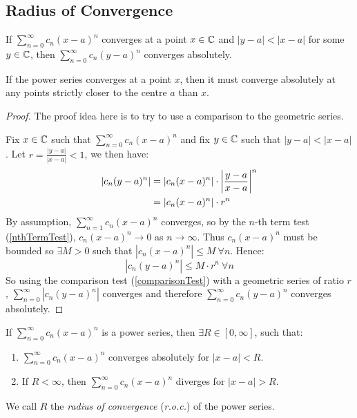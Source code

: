 \documentclass[../main.tex]{subfiles}
\begin{document}
\subsection{Radius of Convergence}
\begin{lemma}
  If $\sum_{n=0}^{\infty} c_n (x - a)^{n}$ converges at a point $x \in \mathbb{C}$ and $|y - a| < |x - a|$ for some $y \in \mathbb{C}$, then $\sum_{n = 0}^{\infty} c_n(y - a)^{n}$ converges absolutely. \label{powerSeriesConvLemma}
\end{lemma}
\begin{remark}
  If the power series converges at a point $x$, then it must converge absolutely at any points strictly closer to the centre $a$ than $x$.
\end{remark}
\begin{proof}
  The proof idea here is to try to use a comparison to the geometric series.

  Fix $x \in \mathbb{C}$ such that $\sum_{n = 0}^{\infty} c_n(x - a)^{n}$ and fix $y \in \mathbb{C}$ such that $|y - a| < |x - a|$.
  Let $r = \frac{|y - a|}{|x - a|} < 1$, we then have:
  \begin{align*}
    |c_n(y - a)^{n}| &= |c_n(x - a)^{n}| \cdot \left\lvert \frac{y - a}{x - a} \right\rvert^{n} \\
                     &= |c_n(x - a)^{n}| \cdot r^{n}
  \end{align*}
  By assumption, $\sum_{n = 1}^{\infty} c_n(x - a)^{n}$ converges, so by the $n$-th term test (\cref{nthTermTest}), $c_n(x - a)^{n} \to 0$ as $n \to \infty$.
  Thus $c_n(x - a)^{n}$ must be bounded so $\exists M > 0$ such that $|c_n(x - a)^{n}| \leq M\ \forall n$.
  Hence:
  \[
    |c_n(y - a)^{n}| \leq M \cdot r^{n}\ \forall n
  \]
  So using the comparison test (\cref{comparisonTest}) with a geometric series of ratio $r$, $\sum_{n = 0}^{\infty} |c_n(y - a)^{n}|$ converges and therefore $\sum_{n = 0}^{\infty} c_n(y - a)^{n}$ converges absolutely.
\end{proof}
\begin{proposition}
  If $\sum_{n = 0}^{\infty} c_n(x - a)^{n}$ is a power series, then $\exists R \in [0, \infty]$, such that:
  \begin{enumerate}
    \item $\sum_{n = 0}^{\infty} c_n(x - a)^{n}$ converges absolutely for $|x - a| < R$.
    \item If $R < \infty$, then $\sum_{n =0}^{\infty} c_n(x - a)^{n}$ diverges for $|x - a| > R$.
  \end{enumerate}
  We call $R$ the \textit{radius of convergence} (\textit{r.o.c.}) of the power series.
\end{proposition}
\end{document}
